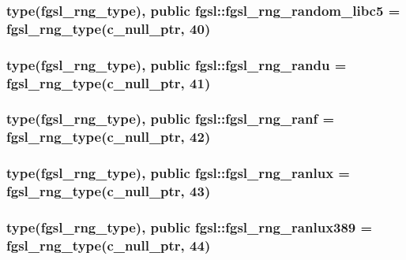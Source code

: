 \subsubsection[{fgsl\+\_\+rng\+\_\+random\+\_\+libc5}]{\setlength{\rightskip}{0pt plus 5cm}type({\bf fgsl\+\_\+rng\+\_\+type}), public fgsl\+::fgsl\+\_\+rng\+\_\+random\+\_\+libc5 = {\bf fgsl\+\_\+rng\+\_\+type}(c\+\_\+null\+\_\+ptr, 40)}\label{namespacefgsl_a642018575871b9b658058f7540ffce03}
\hypertarget{namespacefgsl_a27e0ade0cf0e6155c944ca520547c4a8}{}
\subsubsection[{fgsl\+\_\+rng\+\_\+randu}]{\setlength{\rightskip}{0pt plus 5cm}type({\bf fgsl\+\_\+rng\+\_\+type}), public fgsl\+::fgsl\+\_\+rng\+\_\+randu = {\bf fgsl\+\_\+rng\+\_\+type}(c\+\_\+null\+\_\+ptr, 41)}\label{namespacefgsl_a27e0ade0cf0e6155c944ca520547c4a8}
\hypertarget{namespacefgsl_a40a3682ade652628973e925312f78240}{}
\subsubsection[{fgsl\+\_\+rng\+\_\+ranf}]{\setlength{\rightskip}{0pt plus 5cm}type({\bf fgsl\+\_\+rng\+\_\+type}), public fgsl\+::fgsl\+\_\+rng\+\_\+ranf = {\bf fgsl\+\_\+rng\+\_\+type}(c\+\_\+null\+\_\+ptr, 42)}\label{namespacefgsl_a40a3682ade652628973e925312f78240}
\hypertarget{namespacefgsl_a52505d0b341c829d785f2a0005575a40}{}
\subsubsection[{fgsl\+\_\+rng\+\_\+ranlux}]{\setlength{\rightskip}{0pt plus 5cm}type({\bf fgsl\+\_\+rng\+\_\+type}), public fgsl\+::fgsl\+\_\+rng\+\_\+ranlux = {\bf fgsl\+\_\+rng\+\_\+type}(c\+\_\+null\+\_\+ptr, 43)}\label{namespacefgsl_a52505d0b341c829d785f2a0005575a40}
\hypertarget{namespacefgsl_a1403f9766b272caac077f138b24156ba}{}
\subsubsection[{fgsl\+\_\+rng\+\_\+ranlux389}]{\setlength{\rightskip}{0pt plus 5cm}type({\bf fgsl\+\_\+rng\+\_\+type}), public fgsl\+::fgsl\+\_\+rng\+\_\+ranlux389 = {\bf fgsl\+\_\+rng\+\_\+type}(c\+\_\+null\+\_\+ptr, 44)}\label{namespacefgsl_a1403f9766b272caac077f138b24156ba}
\hypertarget{namespacefgsl_a524c5eebeb98cf095b5bfe9bde105de5}{}
